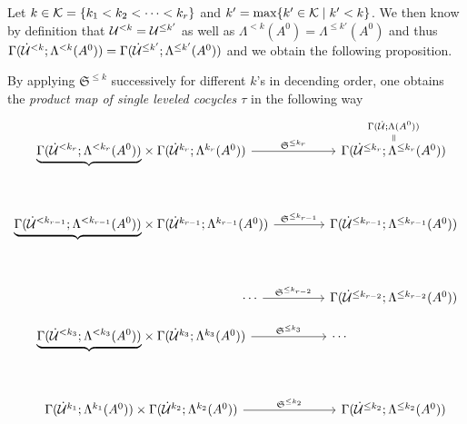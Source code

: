 Let $k\in\mathcal{K}=\{k_1<k_2<\dots<k_r\}$ and $k'=\max\{k'\in\mathcal{K}\mid k'<k\}$. We then
know by definition that $\mathcal{U}^{<k}=\mathcal{U}^{\leq k'}$ as well as
$\Lambda^{< k}(A^0)=\Lambda^{\leq k'}(A^0)$ and thus
$\Gamma(\dot{\mathcal{U}}^{< k};\Lambda^{< k}(A^0))=
\Gamma(\dot{\mathcal{U}}^{\leq k'};\Lambda^{\leq k'}(A^0))$ and we obtain the following
proposition.
\begin{prop}\label{prop:theMapTau}
  By applying $\mathfrak{S}^{\leq k}$ successively for different $k$'s
  in decending order, one obtains the \emph{product map of single leveled
  cocycles $\tau$} in the following way
  \[ \begin{tikzcd}[column sep=1.4cm,row sep=.4cm]
      \underset{\tikzmark{e1}}{\underbrace{%
        \Gamma(\dot\cU^{<k_r};\Lambda^{<k_r}(A^0))}}
      \times
      \Gamma(\dot\cU^{k_r};\Lambda^{k_r}(A^0))
      \rar{\mathfrak{S}^{\leq k_r}}&
      \overset{\normalsize\Gamma(\dot\cU;\Lambda(A^0))}{%
        \overset{\normalsize\text{\rotatebox[origin=c]{-90}{$=$}}}{%
          \Gamma(\dot\cU^{\leq k_r};\Lambda^{\leq k_r}(A^0))
      }}
      \\\\\underset{\tikzmark{e2}}{\underbrace{%
        \Gamma(\dot\cU^{<k_{r-1}};\Lambda^{<k_{r-1}}(A^0))}}
      \times
      \Gamma(\dot\cU^{k_{r-1}};\Lambda^{k_{r-1}}(A^0))
      \rar{\mathfrak{S}^{\leq k_{r-1}}}&
      \overset{\tikzmark{n1}}{%
        \Gamma(\dot\cU^{\leq k_{r-1}};\Lambda^{\leq k_{r-1}}(A^0))}
      \\\\\hspace{6cm}\cdots \rar{\mathfrak{S}^{\leq k_{r-2}}}&
      \overset{\tikzmark{n2}}{%
        \Gamma(\dot\cU^{\leq k_{r-2}};\Lambda^{\leq k_{r-2}}(A^0))}
      \\\underset{\tikzmark{eEND}}{\underbrace{%
        \Gamma(\dot\cU^{<k_3};\Lambda^{<k_3}(A^0))}}
      \times
      \Gamma(\dot\cU^{k_3};\Lambda^{k_3}(A^0))
      \rar{\mathfrak{S}^{\leq k_3}}&
      \cdots\hspace{3cm}
      \\\\
      \Gamma(\dot\cU^{k_1};\Lambda^{k_1}(A^0))
      \times
      \Gamma(\dot\cU^{k_2};\Lambda^{k_2}(A^0))
      \rar{\mathfrak{S}^{\leq k_2}}&
      \overset{\tikzmark{nEND}}{%
        \Gamma(\dot\cU^{\leq k_2};\Lambda^{\leq k_2}(A^0))}
  \end{tikzcd} \]
\end{prop}
